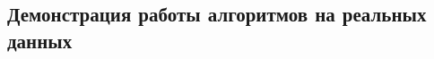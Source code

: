 \documentclass[12pt, specialist, subf
]{disser}
\theoremstyle{definition}
\newcommand{\SSA}{\texttt{SSA}}
\newcommand{\CISSA}{\texttt{CiSSA}}
\newcommand{\TS}{\mathsf{X}}
\begin{document}







\subsection{Демонстрация работы алгоритмов на реальных данных}
\label{subsubsec:real_dataZz}
\end{document}
